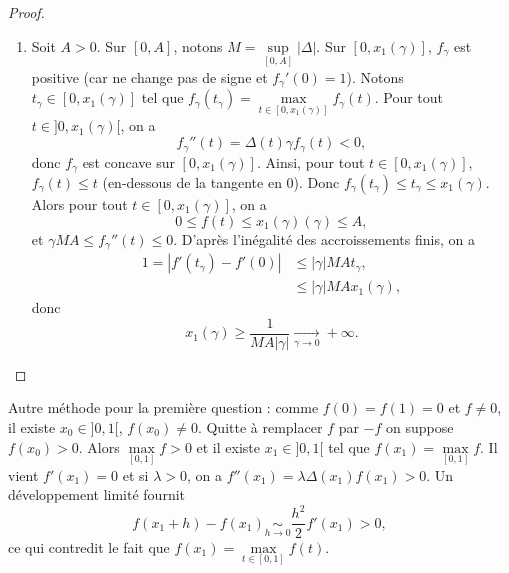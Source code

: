 \documentclass[12pt]{article}
\begin{document}
\begin{proof}
\begin{enumerate}
		\item Soit $A>0$. Sur $[0,A]$, notons $M=\sup\limits_{[0,A]}\left\lvert \Delta\right\rvert$. Sur $[0,x_{1}(\gamma)]$, $f_{\gamma}$ est positive (car ne change pas de signe et $f_{\gamma}'(0)=1$). Notons $t_{\gamma}\in[0,x_{1}(\gamma)]$ tel que $f_{\gamma}(t_{\gamma})=\max\limits_{t\in[0,x_{1}(\gamma)]}f_{\gamma}(t)$. Pour tout $t\in]0,x_{1}(\gamma)[$, on a 
		\begin{equation*}
			f_{\gamma}''(t)=\Delta(t)\gamma f_{\gamma}(t)<0,
		\end{equation*}
		donc $f_{\gamma}$ est concave sur $[0,x_{1}(\gamma)]$. Ainsi, pour tout $t\in[0,x_{1}(\gamma)]$, $f_{\gamma}(t)\leqslant t$ (en-dessous de la tangente en 0). Donc $f_{\gamma}(t_{\gamma})\leqslant t_{\gamma}\leqslant x_{1}(\gamma)$. Alors pour tout $t\in[0,x_{1}(\gamma)]$, on a 
		\begin{equation*}
			0\leqslant f(t)\leqslant x_1(\gamma)(\gamma)\leqslant A,
		\end{equation*}
		et $\gamma MA\leqslant f_{\gamma}''(t)\leqslant0$. D'après l'inégalité des accroissements finis, on a 
		\begin{align*}
			1=\left\lvert f'(t_{\gamma})-f'(0)\right\rvert
			&\leqslant\left\lvert\gamma\right\rvert MAt_{\gamma},\\
			&\leqslant\left\lvert\gamma\right\rvert MAx_{1}(\gamma),
		\end{align*}
		donc 
		\begin{equation*}
			x_{1}(\gamma)\geqslant\frac{1}{MA\left\lvert\gamma\right\rvert}\xrightarrow[\gamma\to0]{}+\infty.
		\end{equation*}
	\end{enumerate}
\end{proof}

\begin{remark}
	Autre méthode pour la première question : comme $f(0)=f(1)=0$ et $f\neq0$, il existe $x_0\in]0,1[$, $f(x_0)\neq0$. Quitte à remplacer $f$ par $-f$ on suppose $f(x_0)>0$. Alors $\max\limits_{[0,1]}f>0$ et il existe $x_1\in]0,1[$ tel que $f(x_1)=\max\limits_{[0,1]}f$. Il vient $f'(x_1)=0$ et si $\lambda>0$, on a $f''(x_1)=\lambda\Delta(x_1)f(x_1)>0$. Un développement limité fournit 
	\begin{equation*}
		f(x_1+h)-f(x_1)\underset{h\to0}{\sim}\frac{h^{2}}{2}f'(x_1)>0,
	\end{equation*}
	ce qui contredit le fait que $f(x_1)=\max\limits_{t\in[0,1]}f(t)$.
\end{remark}
\end{document}
